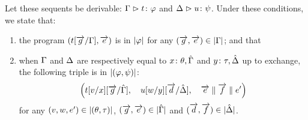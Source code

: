 \begin{proposition}[Adequacy]
 \label{c:adequacy}
 Let these sequents be derivable:
 $  {\Gamma}\vartriangleright{ {t} \colon{\varphi} } $
 and
 $  {\Delta}\vartriangleright{ {u} \colon{\psi} }$\enspace.
 Under these conditions, we state that:
 \begin{enumerate}[label=(\arabic{*}), ref=\textit{(\arabic{*})}]
  \item \label{c:first} the program
	$
	(t[\overrightarrow{g}/\Gamma], \overrightarrow{e})
	$
	is in $|{\varphi}|$
	 for any
	$(\overrightarrow{g},\overrightarrow{e})\in|{\Gamma}|$; and that
  \item \label{c:second}
	when $\Gamma$ and $\Delta$ are respectively
	equal to ${x} \colon{\theta}, \hat{\Gamma}$ and ${y} \colon{\tau}, \hat{\Delta}$ up to exchange,
	the following triple is in $|{(\varphi,\psi)}|$:
	\[\left(
	t[v/x][\overrightarrow g/\hat {\Gamma}],\quad
	u[w/y][\overrightarrow d/\hat {\Delta}],\quad
	\overrightarrow e \parallel \overrightarrow f \parallel e'
	\right)
	\]
	for any
	$(v,w,e')\in|{(\theta,\tau)}|$,
	$(\overrightarrow g,\overrightarrow e)\in|{\hat{\Gamma}}|$ and
	$(\overrightarrow d,\overrightarrow f)\in|{\hat{\Delta}}|$.
  \end{enumerate}
\end{proposition}
